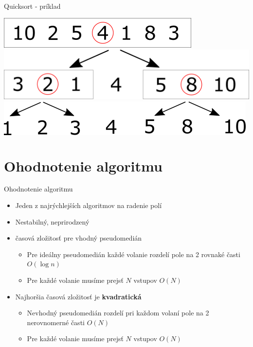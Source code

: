 \documentclass{beamer}
\begin{document}
\begin{frame}{Quicksort - príklad}
  \begin{center}
    \includegraphics[scale=0.6]{img/quicksort_p1.png}
    \pause
    \includegraphics[scale=0.6]{img/quicksort_p2.png}
    \pause
    \includegraphics[scale=0.6]{img/quicksort_p3.png}
  \end{center}
\end{frame}

\section{Ohodnotenie algoritmu}
\begin{frame}{Ohodnotenie algoritmu}
  \begin{itemize}
    \item Jeden z najrýchlejších algoritmov na radenie polí
    \item \alert{Nestabilný}, neprirodzený
    \item \textbf{} časová zložitosť pre vhodný pseudomedián
    \begin{itemize}
        \item Pre ideálny pseudomedián každé volanie rozdelí pole na 2 rovnaké časti $O(\log n)$
        \item Pre každé volanie musíme prejsť $N$ vstupov $O(N)$
    \end{itemize}
    \item Najhoršia časová zložitosť je \alert{\textbf{kvadratická}}
    \begin{itemize}
        \item Nevhodný pseudomedián rozdelí pri každom volaní pole na 2 nerovnomerné časti $O(N)$
        \item Pre každé volanie musíme prejsť $N$ vstupov $O(N)$
    \end{itemize}
  \end{itemize}
\end{frame}
\end{document}

